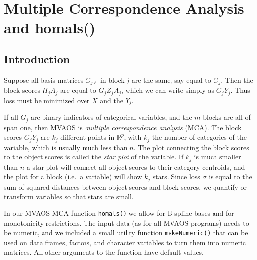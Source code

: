 \documentclass[
  12pt,
]{book}
\begin{document}
\hypertarget{multiple-correspondence-analysis-and-homals}{%
\chapter{Multiple Correspondence Analysis and homals()}\label{multiple-correspondence-analysis-and-homals}}

\hypertarget{introduction-1}{%
\section{Introduction}\label{introduction-1}}

Suppose all basis matrices \(G_{j\ell}\) in block \(j\) are the same, say equal to \(G_j\). Then the block scores \(H_jA_j\) are equal to \(G_jZ_jA_j\), which we can write simply as \(G_jY_j\). Thus loss must be minimized over \(X\) and the \(Y_j\).

If all \(G_j\) are binary indicators of categorical variables, and the \(m\) blocks are all of span one, then MVAOS is \emph{multiple correspondence analysis} (MCA). The block scores \(G_jY_j\) are \(k_j\) different points in \(\mathbb{R}^p\), with \(k_j\) the number of categories of the variable, which is usually much less than \(n\). The plot connecting the block scores to the object scores is called the \emph{star plot} of the variable.
If \(k_j\) is much smaller than \(n\) a star plot will connect all object scores to their category centroids, and the plot for a block (i.e.~a variable) will show \(k_j\) stars. Since loss \(\sigma\) is equal to the sum of squared distances between object scores and block scores, we quantify or transform variables so that stars are small.

In our MVAOS MCA function \texttt{homals()} we allow for B-spline bases and for monotonicity restrictions. The input data (as for all MVAOS programs) needs to be numeric, and we included a small utility function \texttt{makeNumeric()} that can be used on data frames, factors, and character variables to turn them into numeric matrices. All other arguments to the function have default values.
\end{document}
